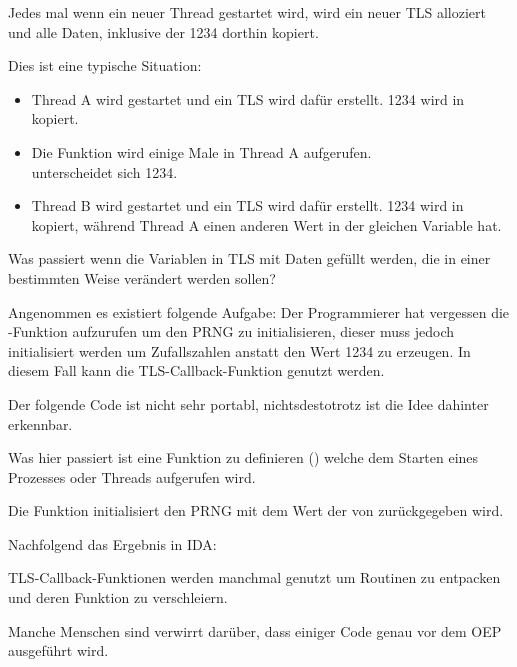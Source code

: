 

Jedes mal wenn ein neuer Thread gestartet wird, wird ein neuer \ac{TLS} alloziert
und alle Daten, inklusive der 1234 dorthin kopiert.

Dies ist eine typische Situation:

\begin{itemize}
\item Thread A wird gestartet und ein \ac{TLS} wird dafür erstellt.
1234 wird in  kopiert.

\item Die Funktion  wird einige Male in Thread A aufgerufen.\\
 unterscheidet sich 1234.

\item Thread B wird gestartet und ein \ac{TLS} wird dafür erstellt.
1234 wird in  kopiert, während Thread A einen anderen Wert
in der gleichen Variable hat.
\end{itemize}


Was passiert wenn die Variablen in \ac{TLS} mit Daten gefüllt werden, die in einer
bestimmten Weise verändert werden sollen?

Angenommen es existiert folgende Aufgabe:
Der Programmierer hat vergessen die -Funktion aufzurufen um den \ac{PRNG} zu initialisieren,
dieser muss jedoch initialisiert werden um  Zufallszahlen anstatt den Wert 1234 zu erzeugen.
In diesem Fall kann die \ac{TLS}-Callback-Funktion genutzt werden.

Der folgende Code ist nicht sehr portabl, nichtsdestotrotz ist die Idee dahinter erkennbar.

Was hier passiert ist eine Funktion zu definieren () welche 
dem Starten eines Prozesses oder Threads aufgerufen wird.

Die Funktion initialisiert den \ac{PRNG} mit dem Wert der von  zurückgegeben wird.



Nachfolgend das Ergebnis in IDA:



TLS-Callback-Funktionen werden manchmal genutzt um Routinen zu entpacken und deren Funktion zu verschleiern.

Manche Menschen sind verwirrt darüber, dass einiger Code genau vor dem \ac{OEP} ausgeführt wird.
